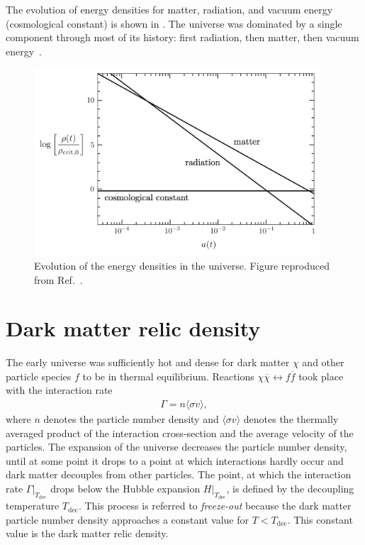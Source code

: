 The evolution of energy densities for matter, radiation, and vacuum energy (cosmological constant) is shown in .
The universe was dominated by a single component through most of its history: first radiation, then matter, then vacuum energy~\cite{Baumann2018}.
\begin{figure}[htbp]
    \centering
    \includegraphics[width=0.95\textwidth]{figures/darkmatter/cosmology.png}
    \caption{Evolution of the energy densities in the universe. Figure reproduced from Ref.~\cite{Baumann2018}.}
    \label{fig:darkmatter:cosmology:energydensity}
\end{figure}


\section{Dark matter relic density}
\label{sec:dm:production}
The early universe was sufficiently hot and dense for dark matter \(\chi\) and other particle species \(f\) to be in thermal equilibrium. Reactions \(\chi \overline{\chi} \leftrightarrow f \overline{f}\) took place with the interaction rate
\begin{align}
    \Gamma = n \langle \sigma v \rangle,
\end{align}
where \(n\) denotes the particle number density and \(\langle\sigma v\rangle\) denotes the thermally averaged product of the interaction cross-section and the average velocity of the particles.
The expansion of the universe decreases the particle number density, until at some point it drops to a point at which interactions hardly occur and dark matter decouples from other particles. The point, at which the interaction rate \(\Gamma|_{T_{\text{dec}}}\) drops below the Hubble expansion \(H|_{T_{\text{dec}}}\), is defined by the decoupling temperature \(T_{\text{dec}}\). This process is referred to \emph{freeze-out} because the dark matter particle number density approaches a constant value for \(T < T_{\text{dec}}\). This constant value is the dark matter relic density.

